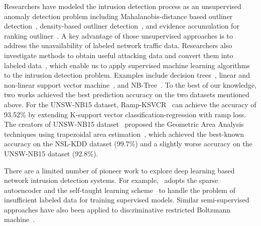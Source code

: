 \label{CompareDL:Sec:RelatedWorks}

Researchers have modeled the intrusion detection process as an unsupervised
anomaly detection problem including Mahalanobis-distance based outliner detection~\cite{ComparativeAnomalyNIDS},
density-based outliner detection~\cite{LOF}, and evidence accumulation for ranking outliner~\cite{RankingOutliner}.
A key advantage of those unsupervised approaches is to address the unavailability of labeled network traffic data.
Researchers also investigate methods to obtain useful attacking data and convert them into labeled data~\cite{KDDCup, NSL-KDD, UNSW},
which enable us to apply supervised machine learning algorithms to the intrusion detection problem.
Examples include decision trees~\cite{DecisionTree}, linear and non-linear support vector machine~\cite{SVM},
and NB-Tree~\cite{NB-Tree}. To the best of our knowledge, two works achieved the best prediction accuracy on the two datasets mentioned above.
For the UNSW-NB15 dataset, Ramp-KSVCR~\cite{RampLossKSVCR} can achieve the accuracy of 93.52\% by extending K-support vector classification-regression with ramp loss. 
The creators of UNSW-NB15 dataset~\cite{UNSW} proposed the Geometric Area Analysis techniques using trapezoidal area estimation~\cite{GAA-ADS},
which achieved the best-known accuracy on the NSL-KDD dataset (99.7\%) and
a slightly worse accuracy on the UNSW-NB15 dataset (92.8\%).

There are a limited number of pioneer work to explore deep learning based network intrusion detection systems.
For example,~\cite{STL-NIDS} adopts the sparse autoencoder and the self-taught learning scheme~\cite{SparseAE}
to handle the problem of insufficient labeled data for training supervised models.
Similar semi-supervised approaches have also been applied to discriminative restricted Boltzmann machine~\cite{AnomalyDetectionRBM}.

